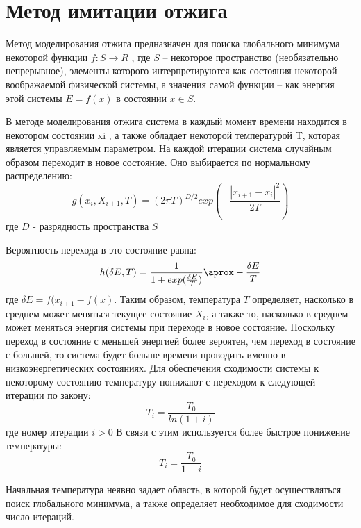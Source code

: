 \documentclass[14pt]{matmex-diploma-custom}
\begin{document}
\section{Метод имитации отжига}
Метод моделирования отжига предназначен для поиска глобального минимума
некоторой функции \( f:S \to R \) , где \( S \) – некоторое пространство (необязательно
непрерывное), элементы которого интерпретируются как состояния некоторой
воображаемой физической системы, а значения самой функции – как энергия этой
системы \( E=f(x) \) в состоянии \( x \in S \).
\par
В методе моделирования отжига система в каждый момент времени находится в
некотором состоянии xi
, а также обладает некоторой температурой T, которая является
управляемым параметром. На каждой итерации система случайным образом переходит в
новое состояние. Оно выбирается по нормальному распределению:
\begin{equation}
    \label{распределение}
    g(x_i, X_{i+1},T) = (2 \pi T)^{D/2}exp(-\frac{|x_{i+1} - x_i|^2}{2T})
\end{equation}
где $D$ - разрядность пространства $S$
\par
Вероятность перехода в это состояние равна:
\begin{equation}
    \label{вероятность}
    h(\delta E, T) = \frac {1} {1 + exp (\frac{\delta E}{T})} \aprox - \frac{\delta E}{T}
\end{equation}
где \( \delta E = f (x_{i+1} - f(x) \). \newline
Таким образом, температура $T$ определяет, насколько в среднем
может меняться текущее состояние $X_i$, а также то, насколько в среднем может меняться
энергия системы при переходе в новое состояние.
Поскольку переход в состояние с меньшей энергией более вероятен, чем переход
в состояние с большей, то система будет больше времени проводить именно в
низкоэнергетических состояниях. Для обеспечения сходимости системы к некоторому
состоянию температуру понижают с переходом к следующей итерации по закону:
\begin{equation}
    \label{закон_температуры}
    T_i = \frac {T_0} {ln(1 + i)}
\end{equation}
где номер итерации $i > 0$ \newline
В связи с этим используется более быстрое понижение температуры:
\begin{equation}
    \label{закон_температуры}
    T_i = \frac {T_0} {1 + i}
\end{equation}
\par
Начальная температура неявно задает область, в которой будет осуществляться
поиск глобального минимума, а также определяет необходимое для сходимости число
итераций.
\end{document}
